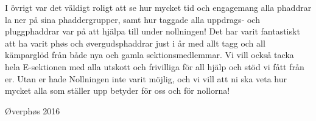 \documentclass[../_main/handlingar.tex]{subfiles}
\begin{document}
\newpage
I övrigt var det väldigt roligt att se hur mycket tid och engagemang alla phaddrar la ner på sina phaddergrupper, samt hur taggade alla uppdrags- och pluggphaddrar var på att hjälpa till under nollningen! Det har varit fantastiskt att ha varit phøs och øvergudsphaddrar just i år med allt tagg och all kämparglöd från både nya och gamla sektionsmedlemmar. Vi vill också tacka hela E-sektionen med alla utskott och frivilliga för all hjälp och stöd vi fått från er. Utan er hade Nollningen inte varit möjlig, och vi vill att ni ska veta hur mycket alla som ställer upp betyder för oss och för nollorna!
\begin{signatures}{1}
    \mvh
    \signature{Molly Rusk}{Øverphøs 2016}
\end{signatures}
\end{document}
